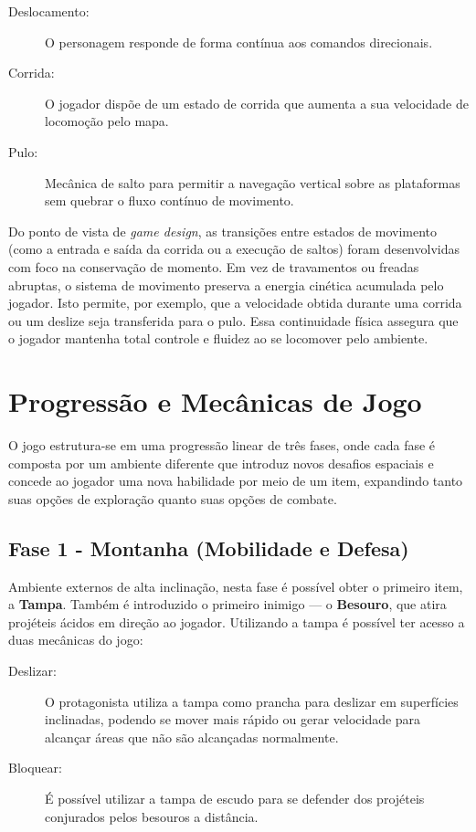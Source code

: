 \begin{description}
	\item[Deslocamento:] O personagem responde de forma
	contínua aos comandos direcionais.
	\item[Corrida:] O jogador dispõe de um estado de corrida
	que aumenta a sua velocidade de locomoção pelo mapa.
	\item[Pulo:] Mecânica de salto para permitir a navegação vertical
	sobre as plataformas sem quebrar o fluxo contínuo de movimento.
\end{description}

Do ponto de vista de \textit{game design}, as transições entre estados de movimento
(como a entrada e saída da corrida ou a execução de saltos) foram desenvolvidas
com foco na conservação de momento. Em vez de travamentos ou freadas abruptas,
o sistema de movimento preserva a energia cinética acumulada pelo jogador. Isto
permite, por exemplo, que a velocidade obtida durante uma corrida ou um deslize
seja transferida para o pulo. Essa continuidade física assegura que o jogador
mantenha total controle e fluidez ao se locomover pelo ambiente.


\section{Progressão e Mecânicas de Jogo}
\label{sec:progressao_e_mecanicas}

O jogo estrutura-se em uma progressão linear de três fases, onde cada
fase é composta por um ambiente diferente que introduz novos desafios
espaciais e concede ao jogador uma nova habilidade por meio de um item,
expandindo tanto suas opções de exploração quanto suas opções de combate.

\subsection{Fase 1 - Montanha (Mobilidade e Defesa)}

Ambiente externos de alta inclinação, nesta fase é possível obter o primeiro item,
a \textbf{Tampa}. Também é introduzido o primeiro inimigo --- o \textbf{Besouro}, que atira projéteis
ácidos em direção ao jogador. Utilizando a tampa é possível ter acesso a duas mecânicas
do jogo:

\begin{description}
	\item[Deslizar:] O protagonista utiliza a tampa como prancha para deslizar em superfícies
	inclinadas, podendo se mover mais rápido ou gerar velocidade para alcançar áreas que não
	são alcançadas normalmente.
	\item[Bloquear:] É possível utilizar a tampa de escudo para se defender dos projéteis
	conjurados pelos besouros a distância.
\end{description}

